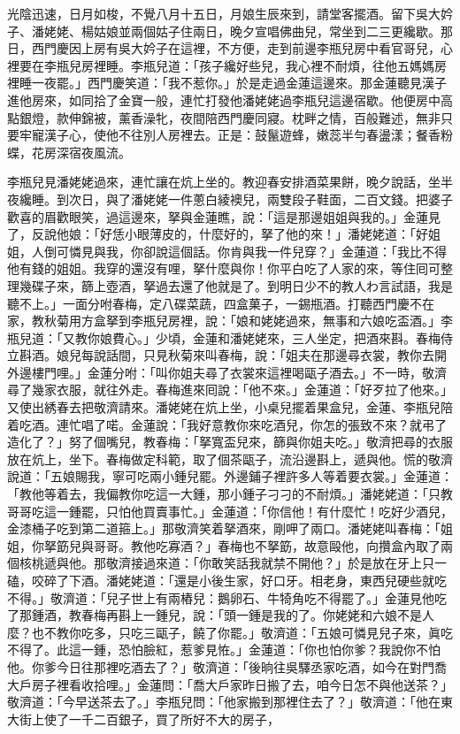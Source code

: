 光陰迅速，日月如梭，不覺八月十五日，月娘生辰來到，請堂客擺酒。留下吳大妗子、潘姥姥、楊姑娘並兩個姑子住兩日，晚夕宣唱佛曲兒，常坐到二三更纔歇。那日，西門慶因上房有吳大妗子在這裡，不方便，走到前邊李瓶兒房中看官哥兒，心裡要在李瓶兒房裡睡。李瓶兒道：「孩子纔好些兒，我心裡不耐煩，往他五媽媽房裡睡一夜罷。」{}西門慶笑道：「我不惹你。」於是走過金蓮這邊來。那金蓮聽見漢子進他房來，如同拾了金寶一般，連忙打發他潘姥姥過李瓶兒這邊宿歇。他便房中高點銀燈，款伸錦被，薰香澡牝，夜間陪西門慶同寢。枕畔之情，百般難述，無非只要牢寵漢子心，使他不往別人房裡去。正是：鼓鬣遊蜂，嫩蕊半勻春盪漾；餐香粉蝶，花房深宿夜風流。

李瓶兒見潘姥姥過來，連忙讓在炕上坐的。教迎春安排酒菜果餅，晚夕說話，坐半夜纔睡。到次日，與了潘姥姥一件蔥白綾襖兒，兩雙段子鞋面，二百文錢。把婆子歡喜的眉歡眼笑，過這邊來，拏與金蓮瞧，說：「這是那邊姐姐與我的。」金蓮見了，反說他娘：「好恁小眼薄皮的，什麼好的，拏了他的來！」潘姥姥道：「好姐姐，人倒可憐見與我，你卻說這個話。你肯與我一件兒穿？」金蓮道：「我比不得他有錢的姐姐。我穿的還沒有哩，拏什麼與你！你平白吃了人家的來，等住囘可整理幾碟子來，篩上壺酒，拏過去還了他就是了。到明日少不的教人わ言試語，我是聽不上。」{}一面分咐春梅，定八碟菜蔬，四盒菓子，一錫瓶酒。打聽西門慶不在家，教秋菊用方盒拏到李瓶兒房裡，說：「娘和姥姥過來，無事和六娘吃盃酒。」李瓶兒道：「又教你娘費心。」少頃，金蓮和潘姥姥來，三人坐定，把酒來斟。春梅侍立斟酒。娘兒每說話間，只見秋菊來叫春梅，說：「姐夫在那邊尋衣裳，教你去開外邊樓門哩。」金蓮分咐：「叫你姐夫尋了衣裳來這裡喝甌子酒去。」不一時，敬濟尋了幾家衣服，就往外走。春梅進來囘說：「他不來。」金蓮道：「好歹拉了他來。」又使出綉春去把敬濟請來。潘姥姥在炕上坐，小桌兒擺着果盒兒，金蓮、李瓶兒陪着吃酒。連忙唱了喏。金蓮說：「我好意教你來吃酒兒，你怎的張致不來？就弔了造化了？」努了個嘴兒，教春梅：「拏寬盃兒來，篩與你姐夫吃。」敬濟把尋的衣服放在炕上，坐下。春梅做定科範，取了個茶甌子，流沿邊斟上，遞與他。慌的敬濟說道：「五娘賜我，寧可吃兩小鍾兒罷。外邊鋪子裡許多人等着要衣裳。」金蓮道：「教他等着去，我偏教你吃這一大鍾，那小鍾子刁刁的不耐煩。」潘姥姥道：「只教哥哥吃這一鍾罷，只怕他買賣事忙。」金蓮道：「你信他！有什麼忙！吃好少酒兒，金漆桶子吃到第二道箍上。」那敬濟笑着拏酒來，剛呷了兩口。潘姥姥叫春梅：「姐姐，你拏筯兒與哥哥。教他吃寡酒？」春梅也不拏筯，故意毆他，向攢盒內取了兩個核桃遞與他。{}那敬濟接過來道：「你敢笑話我就禁不開他？」於是放在牙上只一磕，咬碎了下酒。潘姥姥道：「還是小後生家，好口牙。相老身，東西兒硬些就吃不得。」敬濟道：「兒子世上有兩樁兒：鵝卵石、牛犄角吃不得罷了。」金蓮見他吃了那鍾酒，教春梅再斟上一鍾兒，說：「頭一鍾是我的了。你姥姥和六娘不是人麼？也不教你吃多，只吃三甌子，饒了你罷。」敬濟道：「五娘可憐見兒子來，眞吃不得了。此這一鍾，恐怕臉紅，惹爹見恠。」金蓮道：「你也怕你爹？我說你不怕他。{}你爹今日往那裡吃酒去了？」敬濟道：「後晌往吳驛丞家吃酒，如今在對門喬大戶房子裡看收拾哩。」金蓮問：「喬大戶家昨日搬了去，咱今日怎不與他送茶？」敬濟道：「今早送茶去了。」李瓶兒問：「他家搬到那裡住去了？」敬濟道：「他在東大街上使了一千二百銀子，買了所好不大的房子，
